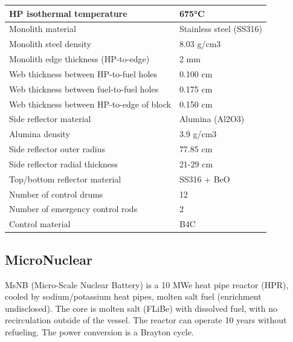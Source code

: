 \begin{table} [hbtp]
\begin{center}
\begin{tabular}{l     l}
HP isothermal temperature&675°C        \\
\hline 
Monolith material&Stainless steel (SS316)       \\
Monolith steel density&8.03 g/cm3                         \\
Monolith edge thickness (HP-to-edge)&2 mm                                 \\
Web thickness between HP-to-fuel holes&0.100 cm                            \\
Web thickness between fuel-to-fuel holes&0.175 cm                            \\
Web thickness between HP-to-edge of block&0.150 cm                            \\
\hline 
Side reflector material&Alumina (Al2O3)       \\
Alumina density&3.9 g/cm3                        \\
Side reflector outer radius&77.85 cm                                 \\
Side reflector radial thickness&21-29 cm                            \\
Top/bottom reflector material&SS316 + BeO                            \\
\hline 
Number of control drums&12       \\
Number of emergency control rods&2       \\
Control material&B4C                        \\
\hline 

\end{tabular}
\end{center}
\end{table}

\pagebreak
\subsection{MicroNuclear}
MsNB  (Micro-Scale  Nuclear  Battery)  is  a  10  MWe  heat  pipe  reactor  (HPR),  cooled  by sodium/potassium heat pipes, molten salt fuel (enrichment undisclosed). The core is molten salt (FLiBe) with dissolved fuel,  with  no  recirculation  outside  of  the  vessel.  The  reactor  can  operate  10  years  without  refueling.  The  power conversion is a Brayton cycle.

